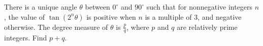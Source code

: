 There is a unique angle $\theta$ between $0^{\circ}$ and $90^{\circ}$ such that for nonnegative integers $n$, the value of $\tan{\left(2^{n}\theta\right)}$ is positive when $n$ is a multiple of $3$, and negative otherwise. The degree measure of $\theta$ is $\tfrac{p}{q}$, where $p$ and $q$ are relatively prime integers. Find $p+q$.